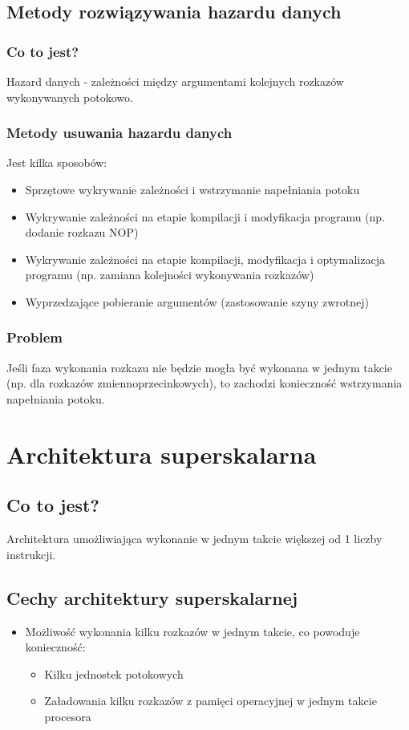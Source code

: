 \documentclass[a4paper,twoside]{article}
\begin{document}
   \subsection*{Metody rozwiązywania hazardu danych}
	   \subsubsection*{Co to jest?}
	   Hazard danych - zależności między argumentami kolejnych rozkazów wykonywanych potokowo.
	   \subsubsection*{Metody usuwania hazardu danych}
	   Jest kilka sposobów:
	   \begin{itemize}
	   		\item Sprzętowe wykrywanie zależności i wstrzymanie napełniania potoku
	   		\item Wykrywanie zależności na etapie kompilacji i modyfikacja programu (np. dodanie rozkazu NOP)
	   		\item Wykrywanie zależności na etapie kompilacji, modyfikacja i optymalizacja programu (np. zamiana kolejności wykonywania rozkazów)
	   		\item Wyprzedzające pobieranie argumentów (zastosowanie szyny zwrotnej)
	   \end{itemize}
	   \subsubsection*{Problem}
		Jeśli faza wykonania rozkazu nie będzie mogła być wykonana w jednym takcie (np. dla rozkazów zmiennoprzecinkowych), to zachodzi konieczność wstrzymania napełniania potoku.
	        	
	
    \section*{Architektura superskalarna}
	    \subsection*{Co to jest?}
	    Architektura umożliwiająca wykonanie w jednym takcie większej od 1 liczby instrukcji.
    	\subsection*{Cechy architektury superskalarnej}
        	\begin{itemize}
            \item Możliwość wykonania kilku rozkazów w jednym takcie, co powoduje konieczność:
	            \begin{itemize}
	            	\item Kilku jednostek potokowych
	            	\item Załadowania kilku rozkazów z pamięci operacyjnej w jednym takcie procesora
	            \end{itemize}
	        
            \end{itemize}
		
\end{document}
